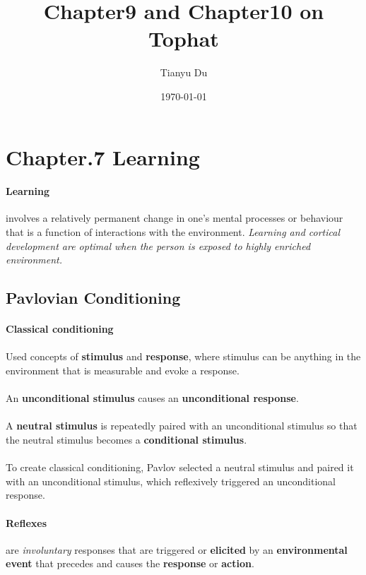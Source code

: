 \documentclass{article}
\title{Chapter9 and Chapter10 on Tophat}
\author{Tianyu Du}
\date{\today}
\begin{document}
	\maketitle
	\doclicenseThis
	\tableofcontents
	\section{Chapter.7 Learning}
	\paragraph{Learning} involves a relatively permanent change in one's mental processes or behaviour that is a function of interactions with the environment. \emph{Learning and cortical development are optimal when the person is exposed to highly enriched environment.}
	\subsection{Pavlovian Conditioning}
	\paragraph{Classical conditioning}
	\paragraph{} Used concepts of \textbf{stimulus} and \textbf{response}, where stimulus can be anything in the environment that is measurable and evoke a response.
	\paragraph{} An \textbf{unconditional stimulus} causes an \textbf{unconditional response}.
	\paragraph{} A \textbf{neutral stimulus} is repeatedly paired with an unconditional stimulus so that the neutral stimulus becomes a \textbf{conditional stimulus}.
	\paragraph{} To create classical conditioning, Pavlov selected a neutral stimulus and paired it with an unconditional stimulus, which reflexively triggered an unconditional response.
	\paragraph{Reflexes} are \emph{involuntary} responses that are triggered or \textbf{elicited} by an \textbf{environmental event} that precedes and causes the \textbf{response} or \textbf{action}.
\end{document}
